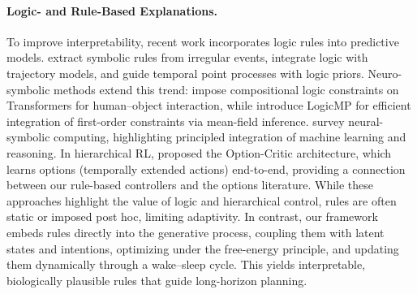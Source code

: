 \documentclass{article} %
\begin{document}
\paragraph{Logic- and Rule-Based Explanations.}
To improve interpretability, recent work incorporates logic rules into predictive models. \citet{li2021explaining} extract symbolic rules from irregular events, \citet{cao2023discovering} integrate logic with trajectory models, and \citet{yangevolving} guide temporal point processes with logic priors. Neuro-symbolic methods extend this trend: \citet{li2023neural} impose compositional logic constraints on Transformers for human–object interaction, while \citet{xu2023logicmp} introduce LogicMP for efficient integration of first-order constraints via mean-field inference. \citet{garcez2019neural} survey neural-symbolic computing, highlighting principled integration of machine learning and reasoning. In hierarchical RL, \citet{bacon2017option} proposed the Option-Critic architecture, which learns options (temporally extended actions) end-to-end, providing a connection between our rule-based controllers and the options literature. While these approaches highlight the value of logic and hierarchical control, rules are often static or imposed post hoc, limiting adaptivity. In contrast, our framework embeds rules directly into the generative process, coupling them with latent states and intentions, optimizing under the free-energy principle, and updating them dynamically through a wake–sleep cycle. This yields interpretable, biologically plausible rules that guide long-horizon planning.
\end{document}
